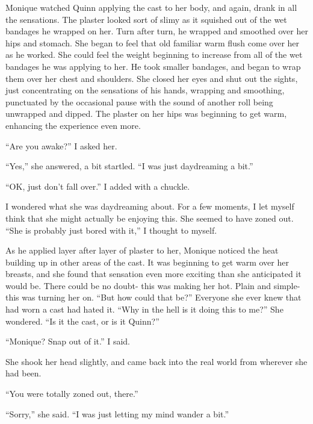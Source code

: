 \begin{thought}
Monique watched Quinn applying the cast to her body, and again, drank in all the sensations.
The plaster looked sort of slimy as it squished out of the wet bandages he wrapped on her. Turn
after turn, he wrapped and smoothed over her hips and stomach. She began to feel that old
familiar warm flush come over her as he worked. She could feel the weight beginning to increase
from all of the wet bandages he was applying to her. He took smaller bandages, and began to wrap
them over her chest and shoulders. She closed her eyes and shut out the sights, just
concentrating on the sensations of his hands, wrapping and smoothing, punctuated by the
occasional pause with the sound of another roll being unwrapped and dipped. The plaster on her
hips was beginning to get warm, enhancing the experience even more.
\end{thought}

``Are you awake?'' I asked her.

``Yes,'' she answered, a bit startled. ``I was just daydreaming a bit.''

``OK, just don't fall over.'' I added with a chuckle.

I wondered what she was daydreaming about. For a few moments, I let myself think that she
might actually be enjoying this. She seemed to have zoned out. ``She is probably just bored with
it,'' I thought to myself.

\begin{thought}
As he applied layer after layer of plaster to her, Monique noticed the heat building up in
other areas of the cast. It was beginning to get warm over her breasts, and she found that
sensation even more exciting than she anticipated it would be. There could be no doubt- this was
making her hot. Plain and simple- this was turning her on. ``But how could that be?'' Everyone
she
ever knew that had worn a cast had hated it. ``Why in the hell is it doing this to me?'' She
wondered. ``Is it the cast, or is it Quinn?''
\end{thought}

``Monique? Snap out of it.'' I said.

She shook her head slightly, and came back into the real world from wherever she had been.

``You were totally zoned out, there.''

``Sorry,'' she said. ``I was just letting my mind wander a bit.''


